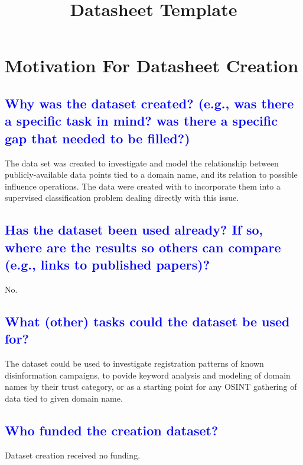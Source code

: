 \documentclass[letterpaper, 10 pt, conference]{ieeeconf}  %
\title{\LARGE \bf
Datasheet Template
}
\begin{document}
\maketitle
\thispagestyle{empty}
\pagestyle{empty}

\section{Motivation For Datasheet Creation}

\textcolor{blue}{\subsection{Why was the dataset created? (e.g., was there a specific task in mind? was there a specific gap that needed to
be filled?)}}

The data set was created to investigate and model the relationship between publicly-available data points tied to a domain name, and its relation to possible influence operations. The data were created with to incorporate them into a supervised classification problem dealing directly with this issue.

\textcolor{blue}{\subsection{Has the dataset been used already? If so, where are the results so others can compare
(e.g., links to published papers)?}}

No.

\textcolor{blue}{\subsection{What (other) tasks could the dataset be used for?}}

The dataset could be used to investigate registration patterns of known disinformation campaigns, to povide keyword analysis and modeling of domain names by their trust category, or as a starting point for any OSINT gathering of data tied to given domain name.

\textcolor{blue}{\subsection{Who funded the creation dataset?}}

Dataset creation received no funding.
\end{document}
